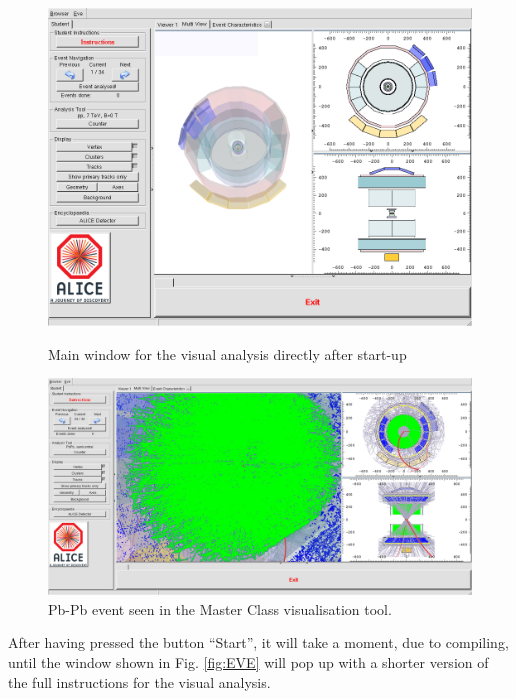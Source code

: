 \documentclass{article}
\begin{document}
\begin{figure}
  \centering 
  \includegraphics[width=\textwidth]{EVEMainWindow.png}
  \caption{Main window for the visual analysis directly after start-up}
  \label{fig:EVE}
  \includegraphics[width=\textwidth]{PbPbEventinTheEVEdisplay.png}
  \caption{Pb-Pb event seen in the Master Class visualisation tool.}
  \label{fig:PbPbEvent}
\end{figure}

After having pressed the button ``Start'', it will take a moment, due to 
compiling, until the window shown in Fig. \ref{fig:EVE} will pop up with a 
shorter version of the full instructions for the visual analysis.\\
\end{document}
